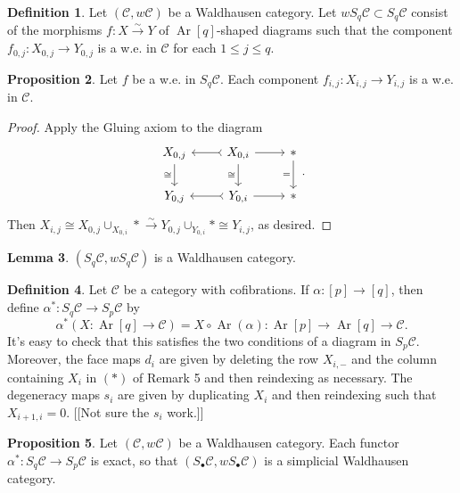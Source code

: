 \documentclass[10pt,letterpaper,cm]{nupset}
\theoremstyle{definition}
\newtheorem{definition}{Definition}
\theoremstyle{theorem}
\newtheorem{lemma}[definition]{Lemma}
\newtheorem{prop}[definition]{Proposition}
\theoremstyle{remark}
\newcommand{\1}{\mathbf{1}}
\renewcommand{\c}{\mathscr{C}}
\newcommand{\0}{\vec 0}
\DeclareMathOperator{\Ar}{Ar}
\begin{document}
\begin{definition}
Let $(\c, w \c)$ be a Waldhausen category. Let $w S_q\c \subset S_q \c$ consist of the morphisms $f: X \overset{\sim}{\longrightarrow} Y$ of $\Ar[q]$-shaped diagrams such that the component $f_{0, j} : X_{0, j} \to Y_{0, j}$ is a w.e. in $\c$ for each $1\leq j \leq q$.
\end{definition}

\begin{prop}
Let $f$ be a w.e. in $S_q \c$.  Each component $f_{i, j}: X_{i, j} \to Y_{i, j}$ is a w.e. in $\c$.
\end{prop}
\begin{proof}
Apply the Gluing axiom to the diagram
\[
\begin{tikzcd}
{X_{0, j}} \arrow[d, "\cong"'] & {X_{0, i}} \arrow[l, tail] \arrow[r] \arrow[d, "\cong"'] & \ast \arrow[d, "="'] \\
{Y_{0, j}} & {Y_{0, i}} \arrow[l, tail] \arrow[r] & \ast
\end{tikzcd}.
\] Then $X_{i, j} \cong X_{0, j} \cup_{X_{0, i}} \ast \overset{\sim}{\longrightarrow} Y_{0, j} \cup_{Y_{0, i}} \ast \cong Y_{i, j}$, as desired.
\end{proof}

\begin{lemma}
$(S_q \c, wS_q \c)$ is a Waldhausen category. 
\end{lemma}

\begin{definition}
Let $\c$ be a category with cofibrations. If $\alpha : [p] \to [q]$, then define $\alpha^{\ast} : S_q \c \to S_p \c$ by
$$\alpha^{\ast}(X: \Ar[q] \to \c) = X \circ \Ar(\alpha) : \Ar[p] \to \Ar[q] \to \c.$$
It's easy to check that this satisfies the two conditions of a diagram in $S_p \c$.
Moreover, the face maps $d_i$ are given by deleting the row $X_{i, -}$ and the column containing $X_i$ in $(\ast)$ of Remark 5 and then reindexing as necessary. The degeneracy maps $s_i$ are given by duplicating $X_i$ and then reindexing such that $X_{i+1, i} =0$. {[[Not sure the $s_i$ work.]]} 
\end{definition}

\begin{prop}
Let $(\c, w \c)$ be a Waldhausen category. Each functor $\alpha^{\ast}: S_q \c \to S_p \c$ is exact, so that $(S_{\bullet}\c, wS_{\bullet} \c)$ is a simplicial Waldhausen category.
\end{prop}	
\end{document}
